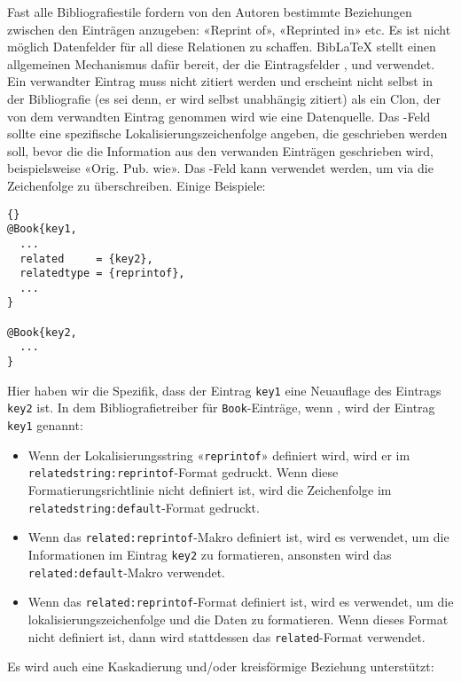 \documentclass{ltxdockit}[2011/03/25]
\newcommand*{\biblatex}{BibLaTeX\xspace}
\begin{document}
Fast alle Bibliografiestile fordern von den Autoren bestimmte Beziehungen 
zwischen den Einträgen anzugeben: «Reprint of», «Reprinted in» etc. Es ist nicht
möglich Datenfelder für all diese Relationen zu schaffen.  \biblatex stellt
einen allgemeinen Mechanismus dafür bereit, der die Eintragsfelder ,  und  
verwendet. Ein verwandter Eintrag muss nicht zitiert werden und erscheint nicht selbst in der Bibliografie (es sei denn, er wird selbst unabhängig zitiert) 
als ein Clon, der von dem verwandten Eintrag genommen wird wie eine 
Datenquelle.  Das -Feld sollte eine spezifische
Lokalisierungszeichenfolge angeben, die geschrieben werden soll, bevor die
die Information aus den verwanden Einträgen geschrieben wird, beispielsweise   «Orig. Pub. wie». Das -Feld kann verwendet werden, um
via  die Zeichenfolge zu überschreiben. Einige Beispiele:

\begin{lstlisting}[style=bibtex]{}
@Book{key1,
  ...
  related     = {key2},
  relatedtype = {reprintof},
  ...
}

@Book{key2,
  ...
}
\end{lstlisting}
%
Hier haben wir die Spezifik, dass der Eintrag \texttt{key1} eine Neuauflage
des Eintrags \texttt{key2} ist. In dem Bibliografietreiber für
\texttt{Book}-Einträge, wenn , wird der Eintrag  \texttt{key1} genannt:

\begin{itemize}
\item Wenn der Lokalisierungsstring «\texttt{reprintof}» definiert wird, wird er
im \texttt{relatedstring:reprintof}-Format gedruckt. Wenn diese Formatierungsrichtlinie nicht definiert ist, wird die Zeichenfolge im   \texttt{relatedstring:default}-Format gedruckt.
\item Wenn das \texttt{related:reprintof}-Makro definiert ist, wird es verwendet, um die Informationen im Eintrag \texttt{key2} zu formatieren, ansonsten wird das  \texttt{related:default}-Makro verwendet. 
\item Wenn das \texttt{related:reprintof}-Format definiert ist, wird es verwendet,
um die lokalisierungszeichenfolge und die Daten zu formatieren.
Wenn dieses Format nicht definiert ist, dann wird stattdessen das 
\texttt{related}-Format verwendet.
\end{itemize}
%
Es wird auch eine Kaskadierung und/oder kreisförmige Beziehung unterstützt: 
\end{document}
